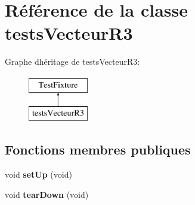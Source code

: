 \hypertarget{classtests_vecteur_r3}{}\section{Référence de la classe tests\+Vecteur\+R3}
\label{classtests_vecteur_r3}
Graphe d\textquotesingle{}héritage de tests\+Vecteur\+R3\+:\begin{figure}[H]
\begin{center}
\leavevmode
\includegraphics[height=2.000000cm]{classtests_vecteur_r3}
\end{center}
\end{figure}
\subsection*{Fonctions membres publiques}
\begin{DoxyCompactItemize}
\item 
\mbox{\label{classtests_vecteur_r3_aab2c7d1043c9f9d55b55dfc273e0d932}} 
void {\bfseries set\+Up} (void)
\item 
\mbox{\label{classtests_vecteur_r3_ac6f02917ca38304b46fe4660295bf3cc}} 
void {\bfseries tear\+Down} (void)
\end{DoxyCompactItemize}
